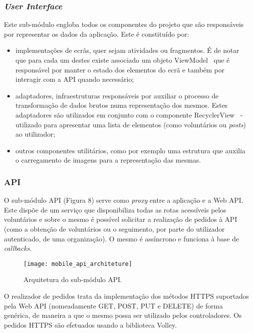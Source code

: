 \subsubsection{\textit{User Interface}}

Este sub-módulo engloba todos os componentes do projeto que são responsáveis por representar os dados da aplicação. Este é constituído por:

\begin{itemize}
	\item implementações de ecrãs, quer sejam atividades ou fragmentos. É de notar que para cada um destes existe associado um objeto ViewModel~\cite{AndroidDevelopers2019} que é responsável por manter o estado dos elementos do ecrã e também por interagir com a API quando necessário; 
	\item adaptadores, infraestruturas responsáveis por auxiliar o processo de transformação de dados brutos numa representação dos mesmos. Estes adaptadores são utilizados em conjunto com o componente RecyclerView~\cite{AndroidDevelopers2020} - utilizado para apresentar uma lista de elementos (como voluntários ou \textit{posts}) ao utilizador;
	\item outros componentes utilitários, como por exemplo uma estrutura que auxilia o carregamento de imagens para a representação das mesmas.
\end{itemize} 

\subsubsection{API}

O sub-módulo API (Figura 8) serve como \textit{proxy} entre a aplicação e a Web API. Este dispõe de um serviço que disponibiliza todas as rotas acessíveis pelos voluntários e sobre o mesmo é possível solicitar a realização de pedidos à API (como a obtenção de voluntários ou o seguimento, por parte do utilizador autenticado, de uma organização). O mesmo é assíncrono e funciona à base de \textit{callbacks}.

\begin{figure}[h]
	\centering
	\texttt{[image: mobile\_api\_architeture]}
	\caption{Arquitetura do sub-módulo API.}
\end{figure}

O realizador de pedidos trata da implementação dos métodos HTTPS suportados pela Web API (nomeadamente GET, POST, PUT e DELETE) de forma genérica, de maneira a que o mesmo possa ser utilizado pelos controladores. Os pedidos HTTPS são efetuados usando a biblioteca Volley.

